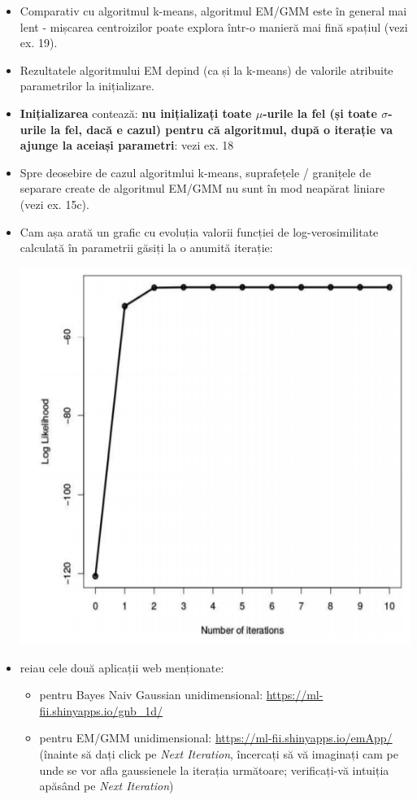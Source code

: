 \documentclass[12pt]{article}
\begin{document}
\begin{itemize}
		\item Comparativ cu algoritmul k-means, algoritmul EM/GMM este în general mai lent - mișcarea centroizilor poate explora într-o manieră mai fină spațiul (vezi ex. 19).
		
		\item Rezultatele algoritmului EM depind (ca și la k-means) de valorile atribuite parametrilor la inițializare.
		
		\item \textbf{Inițializarea} contează: \textbf{nu inițializați toate $\mu$-urile la fel (și toate $\sigma$-urile la fel, dacă e cazul) pentru că algoritmul, după o iterație va ajunge la aceiași parametri}: vezi ex. 18
		
		\item Spre deosebire de cazul algoritmlui k-means, suprafețele / granițele de separare create de algoritmul EM/GMM nu sunt în mod neapărat liniare (vezi ex. 15c).
		
		\item Cam așa arată un grafic cu evoluția valorii funcției de log-verosimilitate calculată în parametrii găsiți la o anumită iterație:
		\begin{center}
			\includegraphics{screenshot005}
		\end{center}
		
		
		\item reiau cele două aplicații web menționate:
		\begin{itemize}
			\item pentru Bayes Naiv Gaussian unidimensional: \url{https://ml-fii.shinyapps.io/gnb_1d/}
			\item pentru EM/GMM unidimensional: \url{https://ml-fii.shinyapps.io/emApp/} (înainte să dați click pe \textit{Next Iteration}, încercați să vă imaginați cam pe unde se vor afla gaussienele la iterația următoare; verificați-vă intuiția apăsând pe \textit{Next Iteration})
		\end{itemize}
	\end{itemize}
	
\end{document}
